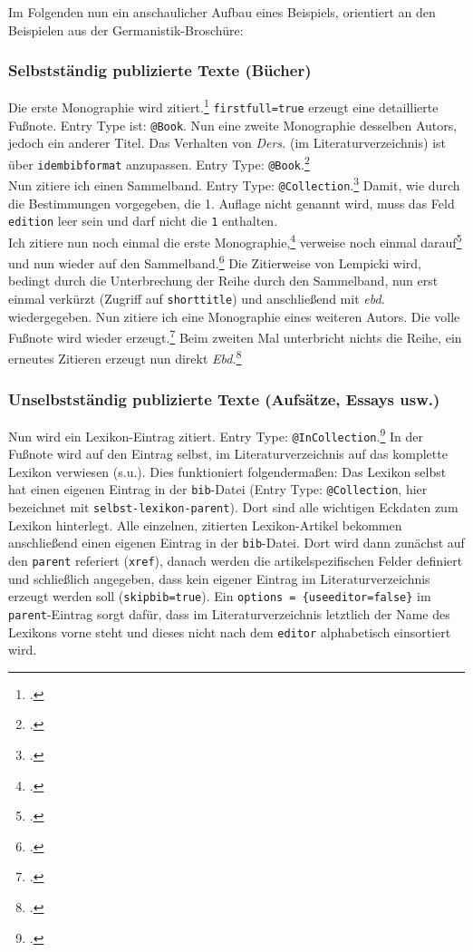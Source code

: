 \documentclass[12pt,notitlepage,parskip]{scrartcl}
\begin{document}
Im Folgenden nun ein anschaulicher Aufbau eines Beispiels, orientiert an den
Beispielen aus der Germanistik-Broschüre:

\subsubsection{Selbstständig publizierte Texte (Bücher)}
Die erste Monographie wird zitiert.\Footcite[1]{selbst-mono}
\texttt{firstfull=true} erzeugt eine detaillierte Fußnote. Entry Type ist:
\texttt{@Book}. Nun eine zweite Monographie desselben Autors, jedoch ein anderer
Titel. Das Verhalten von \textit{Ders.} (im Literaturverzeichnis) ist über
\texttt{idembibformat} anzupassen. Entry
Type: \texttt{@Book}.\Footcite[1]{selbst-mono-2test}\\
Nun zitiere ich einen Sammelband. Entry Type:
\texttt{@Collection}.\Footcite[1]{selbst-sammel} Damit, wie durch die
Bestimmungen vorgegeben, die 1. Auflage nicht genannt wird, muss das Feld
\texttt{edition} leer sein und darf nicht die \texttt{1} enthalten.\\ Ich
zitiere nun noch einmal die erste Monographie,\Footcite[1]{selbst-mono} verweise
noch einmal darauf\Footcite[Vgl.][9]{selbst-mono} und nun wieder auf den
Sammelband.\Footcite[Vgl.][5]{selbst-sammel} Die Zitierweise von Lempicki wird,
bedingt durch die Unterbrechung der Reihe durch den Sammelband, nun erst einmal
verkürzt (Zugriff auf \texttt{shorttitle}) und anschließend mit \textit{ebd.}
wiedergegeben. Nun zitiere ich eine Monographie eines weiteren Autors. Die volle
Fußnote wird wieder erzeugt.\Footcite[1]{selbst-mono2} Beim zweiten Mal
unterbricht nichts die Reihe, ein erneutes Zitieren erzeugt nun direkt
\textit{Ebd.}\Footcite[1]{selbst-mono2}

\subsubsection{Unselbstständig publizierte Texte (Aufsätze, Essays usw.)}
Nun wird ein Lexikon-Eintrag zitiert. Entry Type:
\texttt{@InCollection}.\Footcite[444]{unselbst-lexikon} In der Fußnote wird auf
den Eintrag selbst, im Literaturverzeichnis auf das komplette Lexikon verwiesen
(s.u.). Dies funktioniert folgendermaßen: Das Lexikon selbst hat einen eigenen
Eintrag in der \texttt{bib}-Datei (Entry Type: \texttt{@Collection}, hier
bezeichnet mit \texttt{selbst-lexikon-parent}). Dort sind alle wichtigen
Eckdaten zum Lexikon hinterlegt. Alle einzelnen, zitierten Lexikon-Artikel
bekommen anschließend einen eigenen Eintrag in der \texttt{bib}-Datei. Dort wird
dann zunächst auf den \texttt{parent} referiert (\texttt{xref}), danach werden
die artikelspezifischen Felder definiert und schließlich angegeben, dass kein
eigener Eintrag im Literaturverzeichnis erzeugt werden soll
(\texttt{skipbib=true}). Ein \texttt{options = \{useeditor=false\}} im
\texttt{parent}-Eintrag sorgt dafür, dass im Literaturverzeichnis letztlich der
Name des Lexikons vorne steht und dieses nicht nach dem \texttt{editor}
alphabetisch einsortiert wird.
\end{document}
